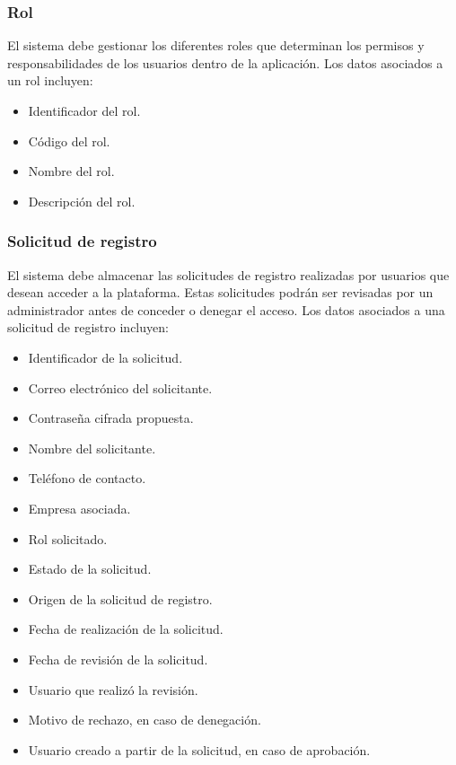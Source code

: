 \subsubsection*{Rol}

El sistema debe gestionar los diferentes roles que determinan los permisos y responsabilidades de los usuarios dentro de la aplicación. Los datos asociados a un rol incluyen:

\begin{itemize}
    \item Identificador del rol.
    \item Código del rol.
    \item Nombre del rol.
    \item Descripción del rol.
\end{itemize}

\subsubsection*{Solicitud de registro}

El sistema debe almacenar las solicitudes de registro realizadas por usuarios que desean acceder a la plataforma. Estas solicitudes podrán ser revisadas por un administrador antes de conceder o denegar el acceso. Los datos asociados a una solicitud de registro incluyen:

\begin{itemize}
    \item Identificador de la solicitud.
    \item Correo electrónico del solicitante.
    \item Contraseña cifrada propuesta.
    \item Nombre del solicitante.
    \item Teléfono de contacto.
    \item Empresa asociada.
    \item Rol solicitado.
    \item Estado de la solicitud.
    \item Origen de la solicitud de registro.
    \item Fecha de realización de la solicitud.
    \item Fecha de revisión de la solicitud.
    \item Usuario que realizó la revisión.
    \item Motivo de rechazo, en caso de denegación.
    \item Usuario creado a partir de la solicitud, en caso de aprobación.
\end{itemize}


